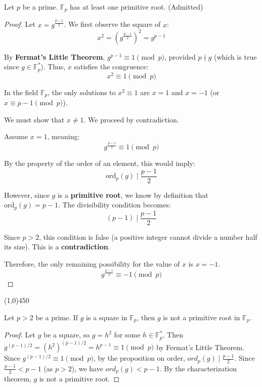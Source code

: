 \begin{theorem}
    Let $p$ be a prime. $\mathbb{F}_{p}$ has at least one primitive root. (Admitted)
\end{theorem}

\bigskip

\begin{proof}
    Let $x = g^{\frac{p-1}{2}}$. We first observe the square of $x$:
    $$x^{2} = \left(g^{\frac{p-1}{2}}\right)^{2} = g^{p-1}$$
    
    By \textbf{Fermat's Little Theorem}, $g^{p-1} \equiv 1 \pmod{p}$, provided $p \nmid g$ (which is true since $g \in \mathbb{F}_p^*$).
    Thus, $x$ satisfies the congruence:
    $$x^{2} \equiv 1 \pmod{p}$$
    
    In the field $\mathbb{F}_{p}$, the only solutions to $x^{2} \equiv 1$ are $x=1$ and $x=-1$ (or $x \equiv p-1 \pmod{p}$).
    
    We must show that $x \neq 1$. We proceed by contradiction.
    
    Assume $x=1$, meaning:
    $$g^{\frac{p-1}{2}} \equiv 1 \pmod{p}$$
    
    By the property of the order of an element, this would imply:
    $$\text{ord}_{p}(g) \mid \frac{p-1}{2}$$
    
    However, since $g$ is a \textbf{primitive root}, we know by definition that $\text{ord}_{p}(g) = p-1$.
    The divisibility condition becomes:
    $$(p-1) \mid \frac{p-1}{2}$$
    
    Since $p>2$, this condition is false (a positive integer cannot divide a number half its size). This is a \textbf{contradiction}.
    
    Therefore, the only remaining possibility for the value of $x$ is $x=-1$.
    $$g^{\frac{p-1}{2}} \equiv -1 \pmod{p}$$
\end{proof}

\begin{center}
    \vspace{10pt}
    \line(1,0){450}
    \vspace{25pt}
\end{center}

\begin{remark}
    Let $p>2$ be a prime. If $g$ is a square in $\mathbb{F}_{p}$, then $g$ is not a primitive root in $\mathbb{F}_{p}$.
\end{remark}
\begin{proof}
    Let $g$ be a square, so $g = h^{2}$ for some $h \in \mathbb{F}_{p}^{*}$.
    Then $g^{(p-1)/2} = (h^{2})^{(p-1)/2} = h^{p-1} \equiv 1 \pmod{p}$ by Fermat's Little Theorem.
    Since $g^{(p-1)/2} \equiv 1 \pmod{p}$, by the proposition on order, $ord_{p}(g) \mid \frac{p-1}{2}$.
    Since $\frac{p-1}{2} < p-1$ (as $p>2$), we have $ord_{p}(g) < p-1$.
    By the characterization theorem, $g$ is not a primitive root.
\end{proof}

